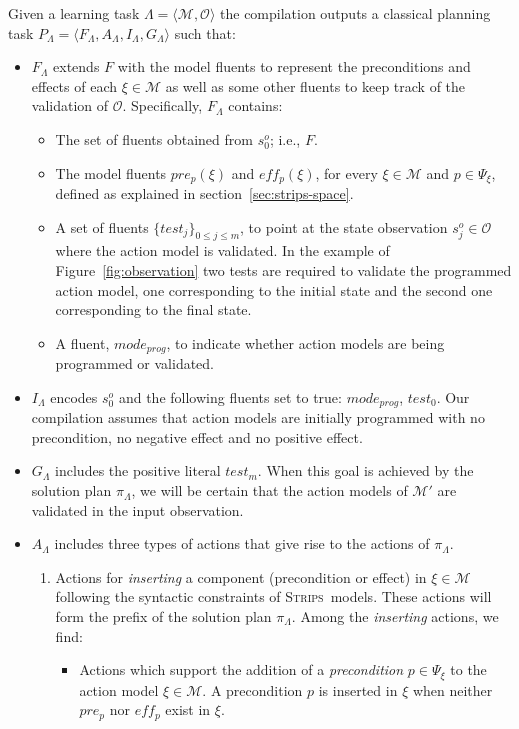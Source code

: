 \documentclass[runningheads]{llncs}
\newcommand{\tup}[1]{{\langle #1 \rangle}}
\newcommand{\strips}{\textsc{Strips}}     %
\begin{document}
Given a learning task $\Lambda=\tup{\mathcal{M},{\mathcal O}}$ the compilation outputs a classical planning task $P_{\Lambda}=\tup{F_{\Lambda},A_{\Lambda},I_{\Lambda},G_{\Lambda}}$ such that:
\begin{itemize}
\item $F_{\Lambda}$ extends $F$ with the model fluents to represent the preconditions and effects of each $\xi\in\mathcal{M}$ as well as some other fluents to keep track of the validation of ${\mathcal O}$. Specifically, $F_{\Lambda}$ contains:
\begin{itemize}
\item The set of fluents obtained from $s_0^o$; i.e., $F$.
\item The model fluents $pre_p(\xi)$ and $eff_p(\xi)$, for every $\xi \in \mathcal{M}$ and $p\in \Psi_{\xi}$, defined as explained in section~\ref{sec:strips-space}.
\item A set of fluents $\{test_j\}_{0\leq j\leq m}$, to point at the state observation $s_j^o\in {\mathcal O}$ where the action model is validated. In the example of Figure~\ref{fig:observation} two tests are required to validate the programmed action model, one corresponding to the initial state and the second one corresponding to the final state.
\item A fluent, $mode_{prog}$, to indicate whether action models are being programmed or validated.
\end{itemize}

\item $I_{\Lambda}$ encodes $s_0^o$ and the following fluents set to true: $mode_{prog}$, $test_0$. Our compilation assumes that action models are initially programmed with no precondition, no negative effect and no positive effect.

\item $G_{\Lambda}$ includes the positive literal $test_m$. When this goal is achieved by the solution plan $\pi_\Lambda$, we will be certain that the action models of $\mathcal{M'}$ are validated in the input observation.

\item $A_{\Lambda}$ includes three types of actions that give rise to the actions of $\pi_\Lambda$.
\begin{enumerate}
\item Actions for {\em inserting} a component (precondition or effect) in $\xi \in \mathcal{M}$ following the syntactic constraints of \strips\ models. These actions will form the prefix of the solution plan $\pi_\Lambda$. Among the \emph{inserting} actions, we find:
\begin{itemize}
\item Actions which support the addition of a {\em precondition} $p\in \Psi_{\xi}$ to the action model $\xi\in\mathcal{M}$. A precondition $p$ is inserted in $\xi$ when neither $pre_p$ nor $eff_p$ exist in $\xi$.


\end{itemize}
\end{enumerate}
\end{itemize}
\end{document}
